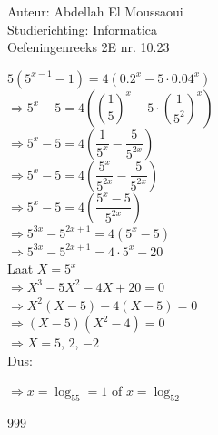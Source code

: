 \documentclass[a4paper]{article}
\begin{document}
  
\noindent \large Auteur: Abdellah El Moussaoui \\
\noindent \large Studierichting: Informatica\\
\noindent \large Oefeningenreeks 2E nr. 10.23\\

\medskip

\normalsize

$5\left(5^{x-1}-1\right) = 4\left(0.2^x-5\cdot0.04^x\right)$\\

$\Rightarrow 5^x - 5 = 4\left(\left(\dfrac{1}{5}\right)^x-5\cdot\left(\dfrac{1}{5^2}\right)^x\right)$\\

$\Rightarrow 5^x - 5 = 4\left(\dfrac{1}{5^x}-\dfrac{5}{5^{2x}}\right)$\\

$\Rightarrow 5^x - 5 = 4\left(\dfrac{5^x}{5^{2x}}-\dfrac{5}{5^{2x}}\right)$\\

$\Rightarrow 5^x - 5 = 4\left(\dfrac{5^x - 5}{5^{2x}}\right)$\\

$\Rightarrow 5^{3x} - 5^{2x+1} = 4\left(5^x - 5\right)$\\

$\Rightarrow 5^{3x} - 5^{2x+1} = 4 \cdot 5^x - 20$\\

Laat $X = 5^x$\\

$\Rightarrow X^{3} - 5 X^2 - 4X + 20 = 0$\\

$\Rightarrow X^2\left(X - 5 \right) - 4\left(X-5\right) = 0$\\

$\Rightarrow \left(X - 5 \right)\left(X^2 - 4\right) = 0$\\

$\Rightarrow X=5$, $2$, $-2$\\

Dus:

$\Rightarrow x=\log_55=1$ of $x=\log_52$\\


\begin{thebibliography}{999}
\end{thebibliography}
\end{document}

